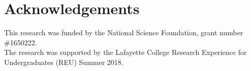 \documentclass[submit]{smj}
\begin{document}
\section*{Acknowledgements}
This research was funded by the National Science Foundation, grant number \#1650222.  \\
The research was supported by the Lafayette College Research Experience for Undergraduates (REU) Summer 2018. 




\end{document}

